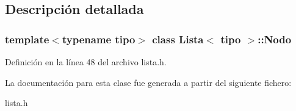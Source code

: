 \subsection{Descripción detallada}
\subsubsection*{template$<$typename tipo$>$\newline
class Lista$<$ tipo $>$\+::\+Nodo}



Definición en la línea 48 del archivo lista.\+h.



La documentación para esta clase fue generada a partir del siguiente fichero\+:\begin{DoxyCompactItemize}
\item 
lista.\+h\end{DoxyCompactItemize}
